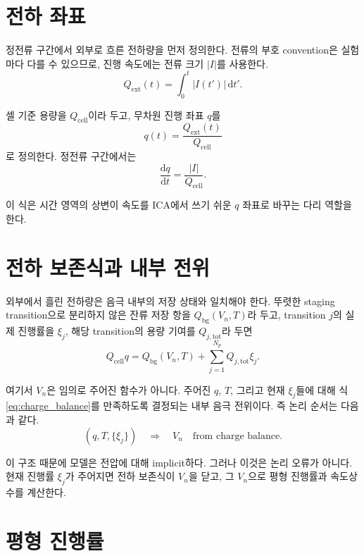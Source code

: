 \documentclass[11pt]{article}
\newcommand{\dd}{\mathrm{d}}
\newcommand{\ext}{\mathrm{ext}}
\newcommand{\cell}{\mathrm{cell}}
\newcommand{\bg}{\mathrm{bg}}
\newcommand{\tot}{\mathrm{tot}}
\begin{document}
\section{전하 좌표}

정전류 구간에서 외부로 흐른 전하량을 먼저 정의한다. 전류의 부호 convention은 실험마다 다를 수 있으므로, 진행 속도에는 전류 크기 \(|I|\)를 사용한다.
\begin{equation}
Q_{\ext}(t)
=
\int_0^t |I(t')|\,\dd t' .
\end{equation}

셀 기준 용량을 \(Q_{\cell}\)이라 두고, 무차원 진행 좌표 \(q\)를
\begin{equation}
q(t)
=
\frac{Q_{\ext}(t)}{Q_{\cell}}
\end{equation}
로 정의한다. 정전류 구간에서는
\begin{equation}
\frac{\dd q}{\dd t}
=
\frac{|I|}{Q_{\cell}} .
\label{eq:dqdt}
\end{equation}

이 식은 시간 영역의 상변이 속도를 ICA에서 쓰기 쉬운 \(q\) 좌표로 바꾸는 다리 역할을 한다.

\section{전하 보존식과 내부 전위}

외부에서 흘린 전하량은 음극 내부의 저장 상태와 일치해야 한다. 뚜렷한 staging transition으로 분리하지 않은 잔류 저장 항을 \(Q_{\bg}(V_n,T)\)라 두고, transition \(j\)의 실제 진행률을 \(\xi_j\), 해당 transition의 용량 기여를 \(Q_{j,\tot}\)라 두면
\begin{equation}
\boxed{
Q_{\cell}q
=
Q_{\bg}(V_n,T)
+
\sum_{j=1}^{N_p}Q_{j,\tot}\xi_j .
}
\label{eq:charge_balance}
\end{equation}

여기서 \(V_n\)은 임의로 주어진 함수가 아니다. 주어진 \(q\), \(T\), 그리고 현재 \(\xi_j\)들에 대해 식 \eqref{eq:charge_balance}를 만족하도록 결정되는 내부 음극 전위이다. 즉 논리 순서는 다음과 같다.
\begin{equation}
(q,T,\{\xi_j\})
\quad\Longrightarrow\quad
V_n
\quad\text{from charge balance.}
\end{equation}

이 구조 때문에 모델은 전압에 대해 implicit하다. 그러나 이것은 논리 오류가 아니다. 현재 진행률 \(\xi_j\)가 주어지면 전하 보존식이 \(V_n\)을 닫고, 그 \(V_n\)으로 평형 진행률과 속도상수를 계산한다.

\section{평형 진행률}
\end{document}
